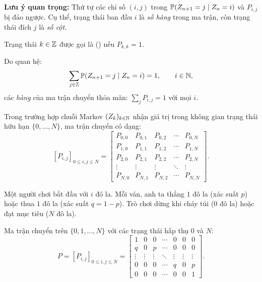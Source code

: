 \textbf{Lưu ý quan trọng:} Thứ tự các chỉ số $(i,j)$ trong $\mathbb{P}(Z_{n+1} = j \mid Z_n = i)$ và $P_{i,j}$ bị đảo ngược. Cụ thể, trạng thái ban đầu $i$ là \emph{số hàng} trong ma trận, còn trạng thái đích $j$ là \emph{số cột}.

\begin{dinhnghia}
Trạng thái $k \in \mathbb{Z}$ được gọi là  () nếu $P_{k,k} = 1$.
\end{dinhnghia}

Do quan hệ:
\begin{equation}\label{eq:row-sum-1}
  \sum_{j \in \mathbb{Z}} \mathbb{P}(Z_{n+1} = j \mid Z_n = i) = 1, \qquad i \in \mathbb{N},
\end{equation}
các \emph{hàng} của ma trận chuyển thỏa mãn: $\sum_{j} P_{i,j} = 1$ với mọi $i$.

Trong trường hợp chuỗi Markov $(Z_k)_{k\in\mathbb{N}}$ nhận giá trị trong không gian trạng thái hữu hạn $\{0, \ldots, N\}$, ma trận chuyển có dạng:
\[
  [P_{i,j}]_{0 \leq i,j \leq N}
  = \begin{bmatrix}
    P_{0,0} & P_{0,1} & P_{0,2} & \cdots & P_{0,N} \\
    P_{1,0} & P_{1,1} & P_{1,2} & \cdots & P_{1,N} \\
    P_{2,0} & P_{2,1} & P_{2,2} & \cdots & P_{2,N} \\
    \vdots  & \vdots  & \vdots  & \ddots & \vdots \\
    P_{N,0} & P_{N,1} & P_{N,2} & \cdots & P_{N,N}
  \end{bmatrix}.
\]

\begin{example}
\label{ex:gambler}
Một người chơi bắt đầu với $i$ đô la. Mỗi ván, anh ta thắng $1$ đô la (xác suất $p$)
hoặc thua $1$ đô la (xác suất $q = 1-p$). Trò chơi dừng khi cháy túi ($0$ đô la) hoặc đạt mục tiêu ($N$ đô la).

Ma trận chuyển trên $\{0, 1, \ldots, N\}$ với các trạng thái hấp thụ $0$ và $N$:
\[
  P = [P_{i,j}]_{0 \leq i,j \leq N}
  = \begin{bmatrix}
    1   & 0 & 0 & \cdots & 0 & 0 & 0 \\
    q   & 0 & p & \cdots & 0 & 0 & 0 \\
    \vdots & \vdots & \vdots & \ddots & \vdots & \vdots & \vdots \\
    0   & 0 & 0 & \cdots & q & 0 & p \\
    0   & 0 & 0 & \cdots & 0 & 0 & 1
  \end{bmatrix}.
\]
\end{example}


